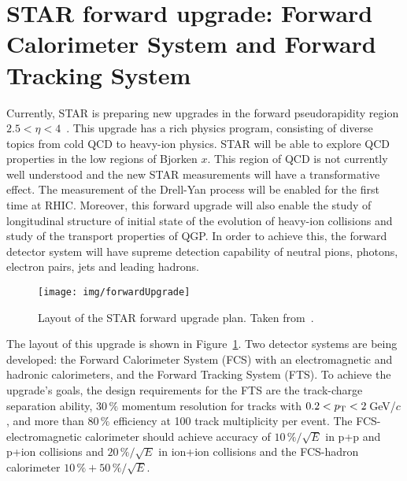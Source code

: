 
\section{STAR forward upgrade: Forward Calorimeter System and
Forward Tracking System }


Currently, STAR is preparing new upgrades in the forward pseudorapidity region $2.5 < \eta < 4$~\cite{forwardProposal}\@. This upgrade has a rich physics program, consisting of diverse topics from cold QCD to heavy-ion physics. STAR will be able to explore QCD properties in the low regions of Bjorken $x$\@. This region of QCD is not currently well understood and the new STAR measurements will have a transformative effect. The measurement of the Drell-Yan process will be enabled for the first time at RHIC\@. Moreover, this forward upgrade will also enable the study of longitudinal structure of initial state of the evolution of heavy-ion collisions and study of the transport properties of QGP\@. In order to achieve this, the forward detector system will have supreme detection capability of neutral pions,
photons, electron pairs, jets and leading hadrons.

\begin{figure}[!htb]
\begin{center}
 \texttt{[image: img/forwardUpgrade]}\\
\end{center}
\caption[Layout of the STAR forward upgrade.]{\label{forward}Layout of the STAR forward upgrade plan. Taken from~\cite{forwardProposal}.}
\end{figure}

The layout of this upgrade is shown in Figure~\ref{forward}\@. Two detector systems are being developed: the Forward Calorimeter System (FCS) with an electromagnetic and hadronic calorimeters, and the Forward Tracking System (FTS)\@. To achieve the upgrade's goals, the design requirements for the FTS are the track-charge separation ability, 30$\,\%$ momentum resolution for tracks with 
$0.2< {p_{\mathrm{T}}} <2\,$GeV/$c$, and more than $80\,\%$ efficiency at 100 track multiplicity per event\@. The FCS-electromagnetic calorimeter should achieve accuracy of $10\,\% / \sqrt{E}$ in p+p and p+ion collisions and $20\,\% / \sqrt{E}$ in ion+ion collisions and the FCS-hadron calorimeter $10\,\% + 50\,\% / \sqrt{E}$.


